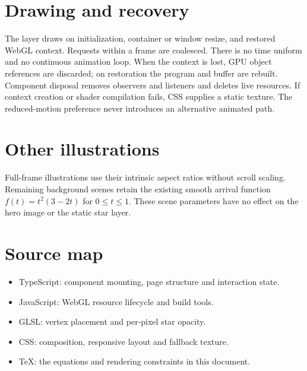 \documentclass[11pt]{article}
\begin{document}
\section{Drawing and recovery}
The layer draws on initialization, container or window resize, and restored
WebGL context. Requests within a frame are coalesced. There is no time uniform
and no continuous animation loop. When the context is lost, GPU object
references are discarded; on restoration the program and buffer are rebuilt.
Component disposal removes observers and listeners and deletes live resources.
If context creation or shader compilation fails, CSS supplies a static texture.
The reduced-motion preference never introduces an alternative animated path.

\section{Other illustrations}
Full-frame illustrations use their intrinsic aspect ratios without scroll
scaling. Remaining background scenes retain the existing smooth arrival
function $f(t)=t^2(3-2t)$ for $0\leq t\leq1$. These scene parameters have no
effect on the hero image or the static star layer.

\section{Source map}
\begin{itemize}
 \item TypeScript: component mounting, page structure and interaction state.
 \item JavaScript: WebGL resource lifecycle and build tools.
 \item GLSL: vertex placement and per-pixel star opacity.
 \item CSS: composition, responsive layout and fallback texture.
 \item TeX: the equations and rendering constraints in this document.
\end{itemize}
\end{document}
